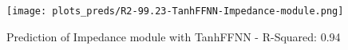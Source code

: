 
\begin{figure}[H]
    \centering
    \texttt{[image: plots\_preds/R2-99.23-TanhFFNN-Impedance-module.png]}
    \caption{Prediction of Impedance module with TanhFFNN - R-Squared: 0.94}
\end{figure}
